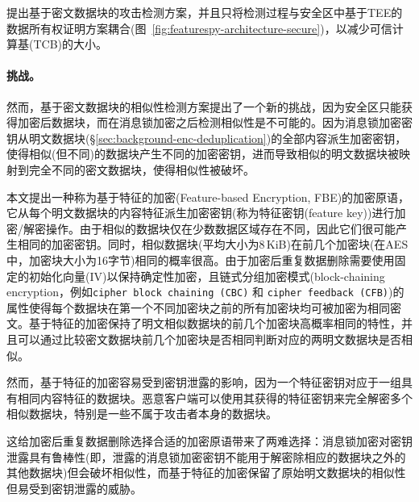 \sysnameF 提出基于密文数据块的攻击检测方案，并且只将检测过程与安全区中基于TEE的数据所有权证明方案耦合(图~\ref{fig:featurespy-architecture-secure})，以减少可信计算基(TCB)的大小。

\paragraph*{挑战。}
然而，基于密文数据块的相似性检测方案提出了一个新的挑战，因为安全区只能获得加密后数据块，而在消息锁加密之后检测相似性是不可能的。因为消息锁加密密钥从明文数据块(\S\ref{sec:background-enc-deduplication})的全部内容派生加密密钥，使得相似(但不同)的数据块产生不同的加密密钥，进而导致相似的明文数据块被映射到完全不同的密文数据块，使得相似性被破坏。

本文提出一种称为基于特征的加密(Feature-based Encryption, FBE)的加密原语，它从每个明文数据块的内容特征派生加密密钥(称为特征密钥(feature key))进行加密/解密操作。由于相似的数据块仅在少数数据区域存在不同，因此它们很可能产生相同的加密密钥。同时，相似数据块(平均大小为8\,KiB)在前几个加密块(在AES中，加密块大小为16字节)相同的概率很高。由于加密后重复数据删除\cite{douceur2002reclaiming, shah15}需要使用固定的初始化向量(IV)以保持确定性加密，且链式分组加密模式(block-chaining encryption，例如{\tt cipher block chaining (CBC)} 和 {\tt cipher feedback (CFB)}\cite{dworkin01})的属性使得每个数据块在第一个不同加密块之前的所有加密块均可被加密为相同密文。基于特征的加密保持了明文相似数据块的前几个加密块高概率相同的特性，并且可以通过比较密文数据块前几个加密块是否相同判断对应的两明文数据块是否相似。

然而，基于特征的加密容易受到密钥泄露的影响，因为一个特征密钥对应于一组具有相同内容特征的数据块。恶意客户端可以使用其获得的特征密钥来完全解密多个相似数据块，特别是一些不属于攻击者本身的数据块。

这给加密后重复数据删除选择合适的加密原语带来了两难选择：消息锁加密对密钥泄露具有鲁棒性(即，泄露的消息锁加密密钥不能用于解密除相应的数据块之外的其他数据块)但会破坏相似性，而基于特征的加密保留了原始明文数据块的相似性但易受到密钥泄露的威胁。
